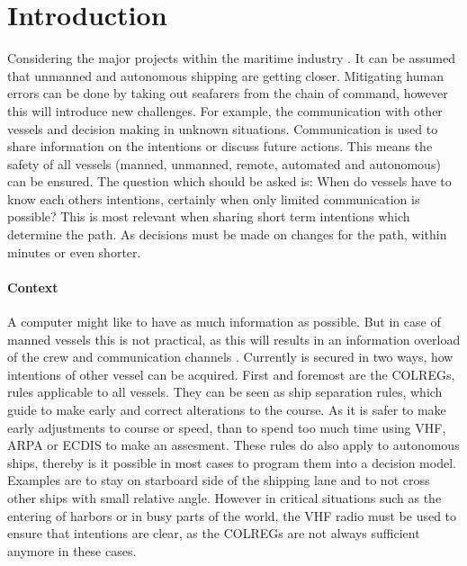 \chapter*{Introduction}
\label{sec:introduction}

Considering the major projects within the maritime industry \cite{SMASH2017} \cite{Eriksen2017} \cite{MUNIN2016} \cite{Sames2017} \cite{RollsRoyce2015} \cite{Waterborne2016}. It can be assumed that unmanned and autonomous shipping are getting closer. Mitigating human errors can be done by taking out seafarers from the chain of command, however this will introduce new challenges. For example, the communication with other vessels and decision making in unknown situations. Communication is used to share information on the intentions or discuss future actions. This means the safety of all vessels (manned, unmanned, remote, automated and autonomous) can be ensured. The question which should be asked is: When do vessels have to know each others intentions, certainly when only limited communication is possible? This is most relevant when sharing short term intentions which determine the path. As decisions must be made on changes for the path, within minutes or even shorter.

\subsubsection*{Context}
A computer might like to have as much information as possible. But in case of manned vessels this is not practical, as this will results in an information overload of the crew and communication channels \cite{CCNR2017}. Currently is secured in two ways, how intentions of other vessel can be acquired. First and foremost are the \ac{COLREGs}\cite{IMO1972}, rules applicable to all vessels. 
They can be seen as ship separation rules, which guide to make early and correct alterations to the course. As it is safer to make early adjustments to course or speed, than to spend too much time using \ac{VHF}, \ac{ARPA} or \ac{ECDIS} to make an assesment. These rules do also apply to autonomous ships, thereby is it possible in most cases to program them into a decision model.
Examples are to stay on starboard side of the shipping lane and to not cross other ships with small relative angle. However in critical situations such as the entering of harbors or in busy parts of the world, the VHF radio must be used to ensure that intentions are clear, as the \ac{COLREGs} are not always sufficient anymore in these cases.

